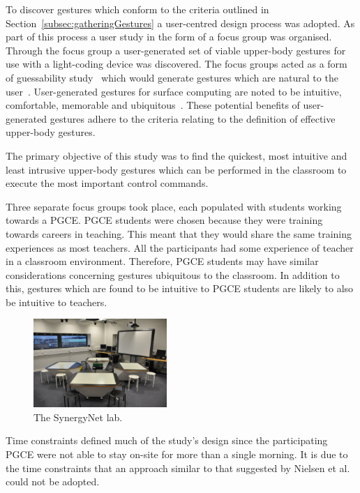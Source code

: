 \documentclass[link]{IWCOMP}
\begin{document}

To discover gestures which conform to the criteria outlined in Section~\ref{subsec:gatheringGestures} a user-centred design process was adopted.
As part of this process a user study in the form of a focus group was organised.
Through the focus group a user-generated set of viable upper-body gestures for use with a light-coding device was discovered.
The focus groups acted as a form of guessability study~\cite{Ruiz2011,Wobbrock2009} which would generate gestures which are natural to the user~\cite{Grandhi2011}.
User-generated gestures for surface computing are noted to be intuitive, comfortable, memorable and ubiquitous~\cite{Bjørneseth2012}.
These potential benefits of user-generated gestures adhere to the criteria relating to the definition of effective upper-body gestures.

The primary objective of this study was to find the quickest, most intuitive and least intrusive upper-body gestures which can be performed in the classroom to execute the most important control commands.

Three separate focus groups took place, each populated with students working towards a \ac{PGCE}.
\ac{PGCE} students were chosen because they were training towards careers in teaching.
This meant that they would share the same training experiences as most teachers.
All the participants had some experience of teacher in a classroom environment.
Therefore, \ac{PGCE} students may have similar considerations concerning gestures ubiquitous to the classroom.
In addition to this, gestures which are found to be intuitive to \ac{PGCE} students are likely to also be intuitive to teachers.

\begin{figure}[h]
   \centering
   \includegraphics[width=0.45\textwidth]{figures/synergynet_lab.png}
   \caption{The SynergyNet lab.}
   \label{fig:synergynetLab}
\end{figure}

Time constraints defined much of the study's design since the participating \ac{PGCE} were not able to stay on-site for more than a single morning.
It is due to the time constraints that an approach similar to that suggested by Nielsen et al.~\citeyearpar{Nielsen2004} could not be adopted.
\end{document}
